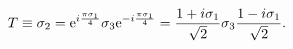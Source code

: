 \begin{equation}
T \equiv \sigma_2 
=
{\rm e}^{i{\pi \sigma_1 \over 4}} \sigma_3
{\rm e}^{-i{\pi \sigma_1 \over 4}} 
=
{1 + i \sigma_1 \over \sqrt2} \sigma_3
{1 - i \sigma_1 \over \sqrt2}
.
\end{equation}

